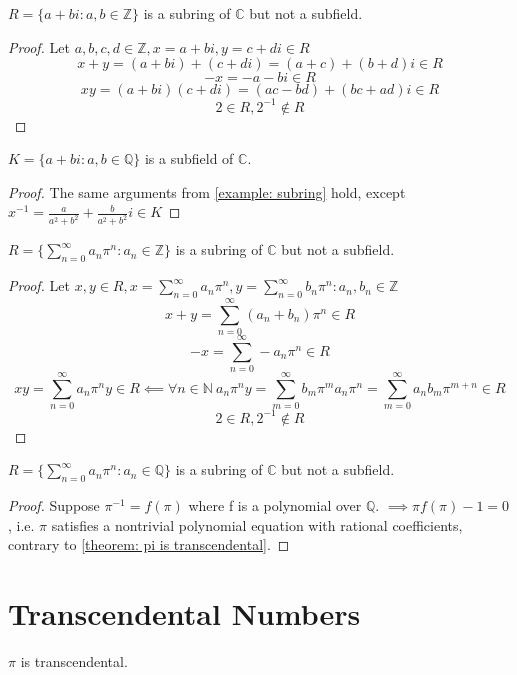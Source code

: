 \documentclass{book}
\begin{document}
    \begin{examples}
    \begin{example} \label{example: subring}
        \(R = \{a + bi : a,b \in \mathbb{Z}\}\) is a subring of \(\mathbb{C}\) but not a subfield.
    \end{example}
    \begin{proof}
        Let \(a,b,c,d \in \mathbb{Z}, x = a + bi, y = c + di \in R\)
        \[x + y = (a + bi) + (c + di) = (a + c) + (b + d)i \in R\]
        \[-x = -a - bi \in R\]
        \[xy = (a + bi)(c + di) = (ac - bd) + (bc + ad)i \in R\]
        \[2 \in R, 2^{-1} \notin R\]
    \end{proof}

    \begin{example}
        \(K = \{a + bi : a,b \in \mathbb{Q}\}\) is a subfield of \(\mathbb{C}\).
    \end{example}
    \begin{proof}
        The same arguments from \cref{example: subring} hold, except
        \(x^{-1} = \frac{a}{a^2 + b^2} + \frac{b}{a^2 + b^2}i \in K\)
    \end{proof}

    \begin{example}
        \(R = \{\sum_{n = 0}^\infty a_n\pi^n : a_n \in \mathbb{Z}\}\) is a subring of \(\mathbb{C}\) but not a subfield.
    \end{example}
    \begin{proof}
        Let \(x, y \in R, x = \sum_{n = 0}^\infty a_n\pi^n, y = \sum_{n = 0}^\infty b_n\pi^n : a_n,b_n \in \mathbb{Z}\)
        \[x + y = \sum_{n = 0}^\infty (a_n + b_n)\pi^n \in R\]
        \[-x = \sum_{n = 0}^\infty -a_n\pi^n \in R\]
        \[
            xy = \sum_{n = 0}^\infty a_n\pi^ny \in R \impliedby
            \forall n \in \mathbb{N} \ a_n\pi^ny = 
            \sum_{m = 0}^\infty b_m\pi^ma_n\pi^n = 
            \sum_{m = 0}^\infty a_nb_m\pi^{m + n} \in R
        \]
        \[2 \in R, 2^{-1} \notin R\]
    \end{proof}

    \begin{example}
        \(R = \{\sum_{n = 0}^\infty a_n\pi^n : a_n \in \mathbb{Q}\}\) is a subring of \(\mathbb{C}\) but not a subfield.
    \end{example}
    \begin{proof}
        Suppose \(\pi^{-1} = f(\pi)\) where f is a polynomial over \(\mathbb{Q}\).
        \(\implies \pi f(\pi) - 1 = 0\), i.e. \(\pi\) satisfies a nontrivial polynomial equation with rational coefficients,
        contrary to \cref{theorem: pi is transcendental}. 
    \end{proof}
    \end{examples}

    \chapter{Transcendental Numbers}
    \begin{theorem} \label{theorem: pi is transcendental}
        \(\pi\) is transcendental.
    \end{theorem}
\end{document}
